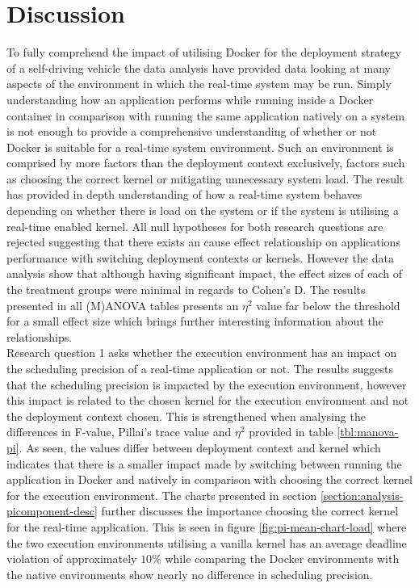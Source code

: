 \iffalse  \fi
\chapter{Discussion} \label{section:discussion}

To fully comprehend the impact of utilising Docker for the deployment strategy of a self-driving vehicle the data analysis have provided data looking at many aspects of the environment in which the real-time system may be run. Simply understanding how an application performs while running inside a Docker container in comparison with running the same application natively on a system is not enough to provide a comprehensive understanding of whether or not Docker is suitable for a real-time system environment. Such an environment is comprised by more factors than the deployment context exclusively, factors such as choosing the correct kernel or mitigating unnecessary system load. The result has provided in depth understanding of how a real-time system behaves depending on whether there is load on the system or if the system is utilising a real-time enabled kernel. All null hypotheses for both research questions are rejected suggesting that there exists an cause effect relationship on applications performance with switching deployment contexts or kernels. However the data analysis show that although having significant impact, the effect sizes of each of the treatment groups were minimal in regards to Cohen's D. The results presented in all (M)ANOVA tables presents an $\eta^{2}$ value far below the threshold for a small effect size which brings further interesting information about the relationships.\\

Research question 1 asks whether the execution environment has an impact on the scheduling precision of a real-time application or not. The results suggests that the scheduling precision is impacted by the execution environment, however this impact is related to the chosen kernel for the execution environment and not the deployment context chosen. This is strengthened when analysing the differences in F-value, Pillai's trace value and $\eta^{2}$ provided in table \ref{tbl:manova-pi}. As seen, the values differ between deployment context and kernel which indicates that there is a smaller impact made by switching between running the application in Docker and natively in comparison with choosing the correct kernel for the execution environment. The charts presented in section \ref{section:analysis-picomponent-desc} further discusses the importance choosing the correct kernel for the real-time application. This is seen in figure \ref{fig:pi-mean-chart-load} where the two execution environments utilising a vanilla kernel has an average deadline violation of approximately $10\%$ while comparing the Docker environments with the native environments show nearly no difference in scheduling precision.\\


